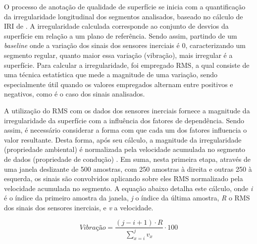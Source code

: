 O processo de anotação de qualidade de superfície se inicia com a quantificação da irregularidade longitudinal dos segmentos analisados, baseado no cálculo de IRI de \cite{Li2018}. A irregularidade calculada corresponde ao conjunto de desvios da superfície em relação a um plano de referência. Sendo assim, partindo de um \textit{baseline} onde a variação dos sinais dos sensores inerciais é 0, caracterizando um segmento regular, quanto maior essa variação (vibração), mais irregular é a superfície. Para calcular a irregularidade, foi empregado RMS, a qual consiste de uma técnica estatística que mede a magnitude de uma variação, sendo especialmente útil quando os valores empregados alternam entre positivos e negativos, como é o caso dos sinais analisados. 

A utilização do RMS com os dados dos sensores inerciais fornece a magnitude da irregularidade da superfície com a influência dos fatores de dependência. Sendo assim, é necessário considerar a forma com que cada um dos fatores influencia o valor resultante. Desta forma, após seu cálculo, a magnitude da irregularidade (propriedade ambiental) é normalizada pela velocidade acumulada no segmento de dados (propriedade de condução) \cite{Li2018}. Em suma, nesta primeira etapa, através de uma janela deslizante de 500 amostras, com 250 amostras à direita e outras 250 à esquerda, os sinais são convolvidos aplicando sobre eles RMS normalizado pela velocidade acumulada no segmento. A equação abaixo detalha este cálculo, onde \emph{i} é o índice da primeiro amostra da janela, \emph{j} o índice da última amostra, \emph{R} o RMS dos sinais dos sensores inerciais, e \emph{v} a velocidade.

\begin{center}
  \[
  \textit{Vibração} = \frac{(j - i + 1) \cdot R}{\sum_{x=i}^{j} v_x} \cdot 100
  \]
\end{center}

